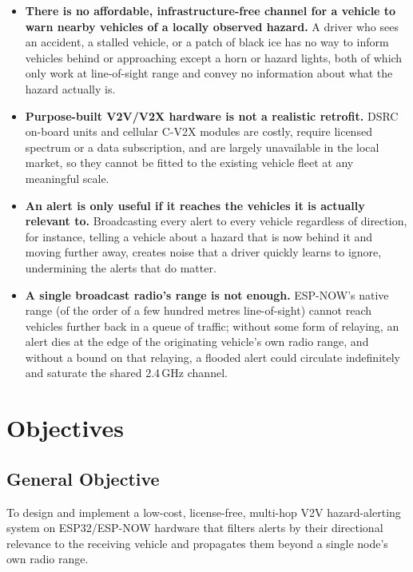 \documentclass[12pt,a4paper]{report}
\begin{document}
\begin{itemize}[leftmargin=1.6em]
\item \textbf{There is no affordable, infrastructure-free channel for a vehicle to warn nearby vehicles of a locally observed hazard.} A driver who sees an accident, a stalled vehicle, or a patch of black ice has no way to inform vehicles behind or approaching except a horn or hazard lights, both of which only work at line-of-sight range and convey no information about what the hazard actually is.

\item \textbf{Purpose-built V2V/V2X hardware is not a realistic retrofit.} DSRC on-board units and cellular C-V2X modules are costly, require licensed spectrum or a data subscription, and are largely unavailable in the local market, so they cannot be fitted to the existing vehicle fleet at any meaningful scale.

\item \textbf{An alert is only useful if it reaches the vehicles it is actually relevant to.} Broadcasting every alert to every vehicle regardless of direction, for instance, telling a vehicle about a hazard that is now behind it and moving further away, creates noise that a driver quickly learns to ignore, undermining the alerts that do matter.

\item \textbf{A single broadcast radio's range is not enough.} ESP-NOW's native range (of the order of a few hundred metres line-of-sight) cannot reach vehicles further back in a queue of traffic; without some form of relaying, an alert dies at the edge of the originating vehicle's own radio range, and without a bound on that relaying, a flooded alert could circulate indefinitely and saturate the shared 2.4\,GHz channel.
\end{itemize}

\section{Objectives}

\subsection{General Objective}
To design and implement a low-cost, license-free, multi-hop V2V hazard-alerting system on ESP32/ESP-NOW hardware that filters alerts by their directional relevance to the receiving vehicle and propagates them beyond a single node's own radio range.
\end{document}
